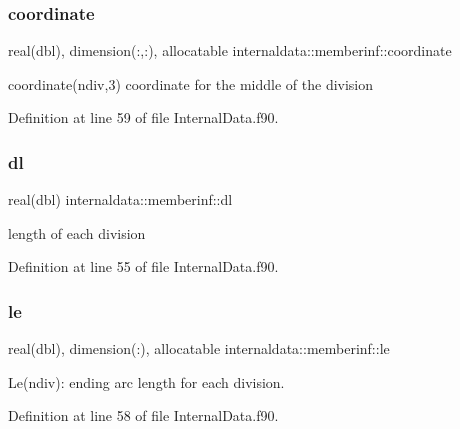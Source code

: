 \subsubsection{\texorpdfstring{coordinate}{coordinate}}
{\footnotesize\ttfamily real(dbl), dimension(\+:,\+:), allocatable internaldata\+::memberinf\+::coordinate}



coordinate(ndiv,3) coordinate for the middle of the division 



Definition at line 59 of file Internal\+Data.\+f90.

\mbox{\label{structinternaldata_1_1memberinf_ace9954daa2b77364ae4984df951fa4d3}} 
\subsubsection{\texorpdfstring{dl}{dl}}
{\footnotesize\ttfamily real(dbl) internaldata\+::memberinf\+::dl}



length of each division 



Definition at line 55 of file Internal\+Data.\+f90.

\mbox{\label{structinternaldata_1_1memberinf_a4328603e20b1c327a37c30020048d96f}} 
\subsubsection{\texorpdfstring{le}{le}}
{\footnotesize\ttfamily real(dbl), dimension(\+:), allocatable internaldata\+::memberinf\+::le}



Le(ndiv)\+: ending arc length for each division. 



Definition at line 58 of file Internal\+Data.\+f90.

\mbox{\label{structinternaldata_1_1memberinf_a992b8e0a6f7e01d33329d4cf9ee5737f}} 
